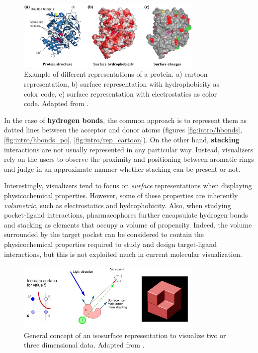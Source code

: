     \begin{figure}[H]
      \centering
      \includegraphics[width=0.8\textwidth]{figures/intro/rep_surfaces.png}
      \caption{\label{fig:intro/rep_surfaces} Example of different representations of a protein. a) cartoon representation, b) surface representation with hydrophobicity as color code, c) surface representation with electrostatics as color code. Adapted from \cite{representations_2018}.}
    \end{figure}

    In the case of \textbf{hydrogen bonds}, the common approach is to represent them as dotted lines between the acceptor and donor atoms (figures \ref{fig:intro/hbonds}, \ref{fig:intro/hbonds_po}, \ref{fig:intro/rep_cartoon}). On the other hand, \textbf{stacking} interactions are not usually represented in any particular way. Instead, visualizers rely on the users to observe the proximity and positioning between aromatic rings and judge in an approximate manner whether stacking can be present or not.

    Interestingly, visualizers tend to focus on \textit{surface} representations when displaying physicochemical properties. However, some of these properties are inherently \textit{volumetric}, such as electrostatics and hydrophobicity. Also, when studying pocket-ligand interactions, pharmacophores further encapsulate hydrogen bonds and stacking as elements that occupy a volume of propensity. Indeed, the volume surrounded by the target pocket can be considered to contain the physicochemical properties required to study and design target-ligand interactions, but this is not exploited much in current molecular visualization.

    \begin{figure}[H]
      \centering
      \includegraphics[width=0.8\textwidth]{figures/intro/isosurfaces.png}
      \caption{\label{fig:intro/isosurfaces} General concept of an isosurface representation to visualize two or three dimensional data. Adapted from \cite{isosurfaces_web}.}
    \end{figure}

